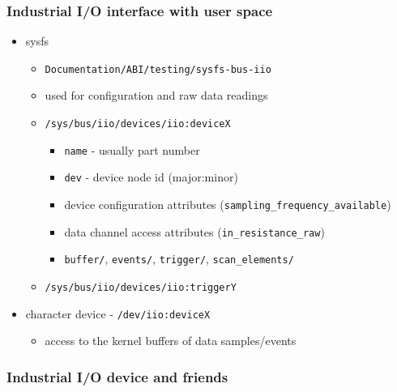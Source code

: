 \documentclass[aspectratio=169]{beamer}
\begin{document}
\begin{frame}
\frametitle{Industrial I/O interface with user space}
\begin{itemize}
    \item sysfs
    \begin{itemize}
        \item \texttt{Documentation/ABI/testing/sysfs-bus-iio}
        \item used for configuration and raw data readings
        \item \texttt{/sys/bus/iio/devices/iio:deviceX}
        \begin{itemize}
            \item \texttt{name} - usually part number
            \item \texttt{dev} - device node id (major:minor)
            \item device configuration attributes (\texttt{sampling\_frequency\_available})
            \item data channel access attributes (\texttt{in\_resistance\_raw})
            \item \texttt{buffer/}, \texttt{events/}, \texttt{trigger/}, \texttt{scan\_elements/}
        \end{itemize}
        \item \texttt{/sys/bus/iio/devices/iio:triggerY}
    \end{itemize}
    \item character device - \texttt{/dev/iio:deviceX}
    \begin{itemize}
        \item access to the kernel buffers of data samples/events
    \end{itemize}
\end{itemize}
\end{frame}


\begin{frame}
\frametitle{Industrial I/O device and friends}
\begin{figure}
\end{figure}
\end{frame}


\end{document}
